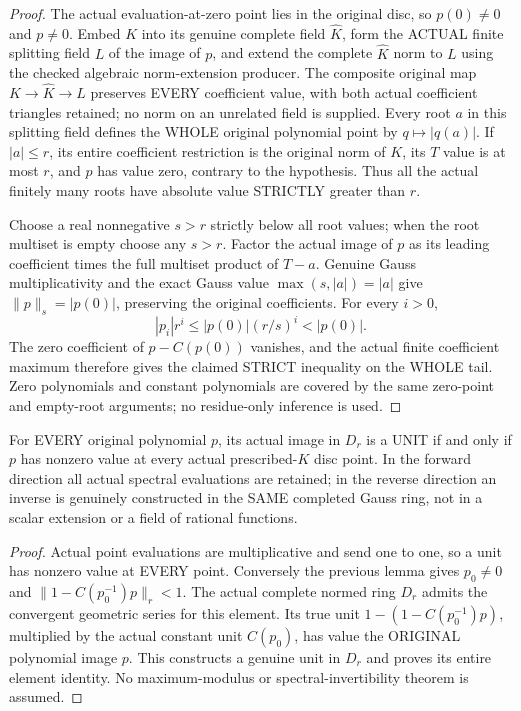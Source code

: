\begin{proof}
The actual evaluation-at-zero point lies in the original disc, so $p(0)\ne0$
and $p\ne0$. Embed $K$ into its genuine complete field $\widehat K$, form the
ACTUAL finite splitting field $L$ of the image of $p$, and extend the complete
$\widehat K$ norm to $L$ using the checked algebraic norm-extension producer.
The composite original map $K\to\widehat K\to L$ preserves EVERY coefficient
value, with both actual coefficient triangles retained; no norm on an unrelated
field is supplied. Every root $a$ in this splitting field defines the WHOLE
original polynomial point by $q\mapsto |q(a)|$. If $|a|\le r$, its entire
coefficient restriction is the original norm of $K$, its $T$ value is at most
$r$, and $p$ has value zero, contrary to the hypothesis. Thus all the actual
finitely many roots have absolute value STRICTLY greater than $r$.

Choose a real nonnegative $s>r$ strictly below all root values; when the root
multiset is empty choose any $s>r$. Factor the actual image of $p$ as its
leading coefficient times the full multiset product of $T-a$. Genuine Gauss
multiplicativity and the exact Gauss value $\max(s,|a|)=|a|$ give
$\|p\|_s=|p(0)|$, preserving the original coefficients. For every $i>0$,
\[
 |p_i|r^i\le |p(0)|(r/s)^i<|p(0)|.
\]
The zero coefficient of $p-C(p(0))$ vanishes, and the actual finite coefficient
maximum therefore gives the claimed STRICT inequality on the WHOLE tail.
Zero polynomials and constant polynomials are covered by the same zero-point
and empty-root arguments; no residue-only inference is used.
\end{proof}

\begin{theorem}
\label{analytic:actual-disc-polynomial-spectral-unit}
\leanok
{}
For EVERY original polynomial $p$, its actual image in $D_r$ is a UNIT if and
only if $p$ has nonzero value at every actual prescribed-$K$ disc point.
In the forward direction all actual spectral evaluations are retained; in the
reverse direction an inverse is genuinely constructed in the SAME completed
Gauss ring, not in a scalar extension or a field of rational functions.
\end{theorem}
\begin{proof}
Actual point evaluations are multiplicative and send one to one, so a unit has
nonzero value at EVERY point. Conversely the previous lemma gives $p_0\ne0$
and $\|1-C(p_0^{-1})p\|_r<1$. The actual complete normed ring $D_r$ admits the
convergent geometric series for this element. Its true unit $1-(1-C(p_0^{-1})p)$,
multiplied by the actual constant unit $C(p_0)$, has value the ORIGINAL polynomial
image $p$. This constructs a genuine unit in $D_r$ and proves its entire element
identity. No maximum-modulus or spectral-invertibility theorem is assumed.
\end{proof}


